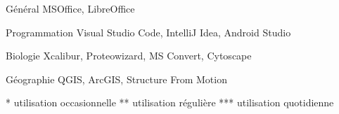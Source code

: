 

\begin{cvpairs}

  
\cvpair
    {Général} %
    {MSOffice, LibreOffice} %

  
\cvpair
    {Programmation} %
    {Visual Studio Code, IntelliJ Idea, Android Studio} %

  
\cvpair
    {Biologie} %
    {Xcalibur, Proteowizard, MS Convert, Cytoscape} %

  
\cvpair
    {Géographie} %
    {QGIS, ArcGIS, Structure From Motion} %

\end{cvpairs}

{\color{teal}\footnotesize
* utilisation occasionnelle \quad
** utilisation régulière \quad
*** utilisation quotidienne
}